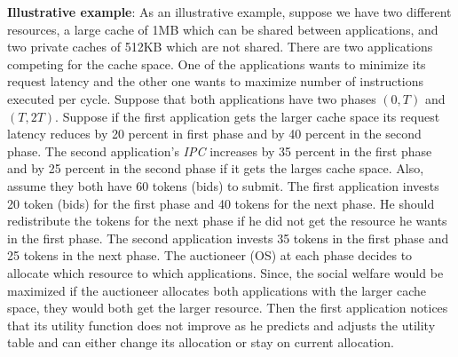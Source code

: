 \indent \textbf{Illustrative example}: As an illustrative example, suppose we have two different resources, a large cache of 1MB which can be shared between applications, and two private caches of 512KB which are not shared. There are two applications competing for the cache space. One of the applications wants to minimize its request latency and the other one wants to maximize number of instructions executed per cycle. Suppose that both applications have two phases $(0,T)$ and $(T,2T)$.  Suppose if the first application gets the larger cache space its request latency reduces by 20 percent in first phase and by 40 percent in the second phase. The second application's \textit{IPC} increases by 35 percent in the first phase and by 25 percent in the second phase if it gets the larges cache space. Also, assume they both have 60 tokens (bids) to submit. The first application invests 20 token (bids) for the first phase and 40 tokens for the next phase. He should redistribute the tokens for the next phase if he did not get the resource he wants in the first phase. The second application invests 35 tokens in the first phase and 25 tokens in the next phase. The auctioneer (OS) at each phase decides to allocate which resource to which applications. Since, the social welfare would be maximized if the auctioneer allocates both applications with the larger cache space, they would both get the larger resource. Then the first application notices that its utility function does not improve as he predicts and adjusts the utility table and can either change its allocation or stay on current allocation. 
